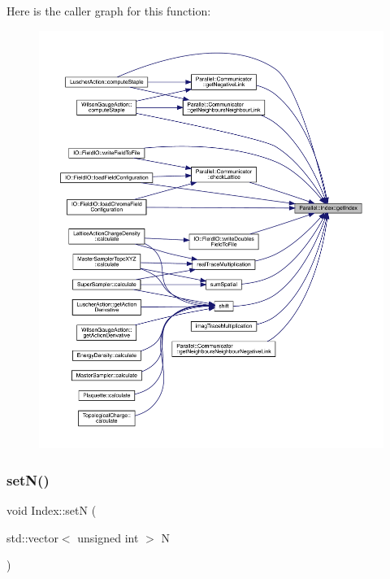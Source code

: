 Here is the caller graph for this function\+:\nopagebreak
\begin{figure}[H]
\begin{center}
\leavevmode
\includegraphics[width=350pt]{class_parallel_1_1_index_af31faeef1369fdc0997d1910e008bfe2_icgraph}
\end{center}
\end{figure}
\mbox{\label{class_parallel_1_1_index_acbf43868aa2efc7ecf63b5b490fc00a0}} 
\subsubsection{\texorpdfstring{setN()}{setN()}}
{\footnotesize\ttfamily void Index\+::setN (\begin{DoxyParamCaption}\item[{std\+::vector$<$ unsigned int $>$}]{N }\end{DoxyParamCaption})\hspace{0.3cm}{\ttfamily [static]}}



